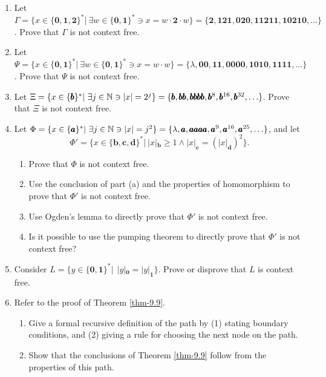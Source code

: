 \begin{enumerate}[{9.}1.]
\item Let $\Gamma=\{x\in\{\pmb{0},\pmb{1},\pmb{2}\}^*|\ \exists w\in\{\pmb{0},
\pmb{1}\}^* \ni x=w\cdot\pmb{2}\cdot w\}=\{\pmb{2},\pmb{121},\pmb{020},\pmb{1121
1},\pmb{10210},\ldots\}$. Prove that $\Gamma$ is not context free.

\item Let $\Psi=\{x\in\{\pmb{0},\pmb{1}\}^*|\ \exists w\in\{\pmb{0},\pmb{1}\}^*\ni
x = w\cdot w\}=\{\lambda,\pmb{00},\pmb{11},\pmb{0000},\pmb{1010},\pmb{1111},
\ldots\}$. Prove that $\Psi$ is not context free.

\item Let $\Xi=\{x\in\{\pmb{b}\}^*|\ \exists j\in\mathbb{N}\ni |x|=2^j\}=\{\pmb{b},
\pmb{bb},\pmb{bbbb},\pmb{b}^8,\pmb{b}^{16},\pmb{b}^{32},\ldots\}$. Prove that
$\Xi$ is not context free.

\item Let $\Phi=\{x\in\{\pmb{a}\}^*|\ \exists j\in\mathbb{N} \ni |x|= j^2\}=\{\lambda,
\pmb{a},\pmb{aaaa},\pmb{a}^9,\pmb{a}^{16},\pmb{a}^{25},\ldots\}$, and let
\[ \Phi'=\{x\in\{\pmb{b},\pmb{c},\pmb{d}\}^*|\  |x|_{\pmb{b}}\geq 1 \wedge |x|_{
	\pmb{c}}=(|x|_{\pmb{d}})^2\}. \]
\begin{enumerate}
\item Prove that $\Phi$ is not context free.
\item Use the conclusion of part (a) and the properties of homomorphism to prove
that $\Phi'$ is not context free.
\item Use Ogden's lemma to directly prove that $\Phi'$ is not context free.
\item Is it possible to use the pumping theorem to directly prove that $\Phi'$
is not context free?
\end{enumerate}

\item Consider $L=\{y\in\{\pmb{0},\pmb{1}\}^*|\ \ |y|_{\pmb{0}}=|y|_{\pmb{1}}\}$.
Prove or disprove that $L$ is context free.

\item Refer to the proof of Theorem \ref{thm-9.9}.
\begin{enumerate}
\item Give a formal recursive definition of the path by (1) stating boundary
conditions, and (2) giving a rule for choosing the next node on the path.
\item Show that the conclusions of Theorem \ref{thm-9.9} follow from the properties of
this path.
\end{enumerate}


\end{enumerate}
